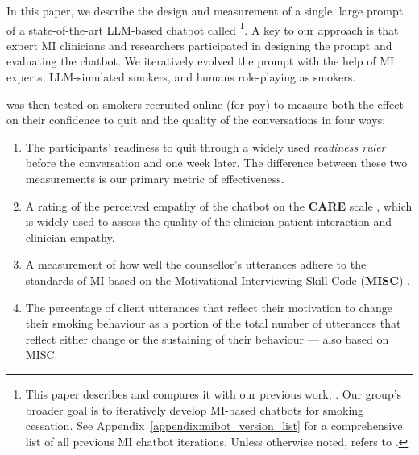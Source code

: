 In this paper, we describe the design and measurement of a single, large prompt of a state-of-the-art LLM-based chatbot called \textbf{\sysname} \footnote{This paper describes \sysnamewithv and compares it with our previous work, \oldsysname \citep{info:doi/10.2196/49132}. Our group's broader goal is to iteratively develop MI-based chatbots for smoking cessation. See Appendix~\ref{appendix:mibot_version_list} for a comprehensive list of all previous MI chatbot iterations. Unless otherwise noted, \sysname refers to \sysnamewithv.}. A key to our approach is that expert MI clinicians and researchers participated in designing the prompt and evaluating the chatbot. We iteratively evolved the prompt with the help of MI experts, LLM-simulated smokers, and humans role-playing as smokers.

\sysname was then tested on smokers recruited online (for pay) to measure both the effect on their confidence to quit and the quality of the conversations in four ways:\vspace{-0.2em}
\begin{enumerate}[itemsep=0pt, parsep=0pt]
    \item The participants' readiness to quit through a widely used \emph{readiness ruler} \citep{Boudreaux2012} before the conversation and one week later. The difference between these two measurements is our primary metric of effectiveness.
    \item A rating of the perceived empathy of the chatbot on the \textbf{CARE} scale \citep{10.1093/fampra/cmh621}, which is widely used to assess the quality of the clinician-patient interaction and clinician empathy.
    \item A measurement of how well the counsellor's utterances adhere to the standards of MI based on the Motivational Interviewing Skill Code (\textbf{MISC}) \citep{MISC}.
    \item The percentage of client utterances that reflect their motivation to change their smoking behaviour as a portion of the total number of utterances that reflect either change or the sustaining of their behaviour --- also based on MISC.
\end{enumerate}

